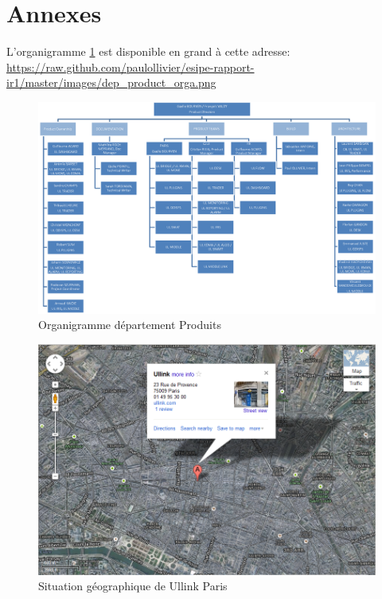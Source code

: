 \documentclass[a4paper, 12pt]{article}
\begin{document}
\pagebreak

\part*{Annexes}
L'organigramme \ref{Product_dpts_orga} est disponible en grand à cette adresse: \url{https://raw.github.com/paulollivier/esipe-rapport-ir1/master/images/dep_product_orga.png}
\begin{figure}
\includegraphics[width=525pt, angle=90]{dep_product_orga.png}
\caption{Organigramme département Produits}
\label{Product_dpts_orga}
\end{figure}

\begin{figure}
\includegraphics[width=\textwidth]{ullink_loc.png}
\caption{Situation géographique de Ullink Paris}
\label{ullink_loc}
\end{figure}
\end{document}
